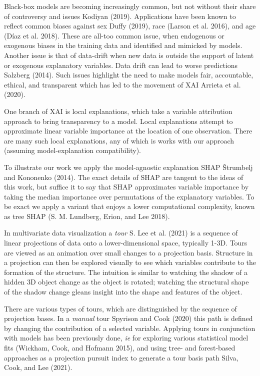 \documentclass[
]{article}
\begin{document}
Black-box models are becoming increasingly common, but not without their share of controversy and issues Kodiyan (2019). Applications have been known to reflect common biases against sex Duffy (2019), race (Larson et al. 2016), and age (Díaz et al. 2018). These are all-too common issue, when endogenous or exogenous biases in the training data and identified and mimicked by models. Another issue is that of data-drift when new data is outside the support of latent or exogenous explanatory variables. Data drift can lead to worse predictions Salzberg (2014). Such issues highlight the need to make models fair, accountable, ethical, and transparent which has led to the movement of XAI Arrieta et al. (2020).

One branch of XAI is local explanations, which take a variable attribution approach to bring transparency to a model. Local explanations attempt to approximate linear variable importance at the location of one observation. There are many such local explanations, any of which is works with our approach (assuming model-explanation compatibility).

To illustrate our work we apply the model-agnostic explanation SHAP Štrumbelj and Kononenko (2014). The exact details of SHAP are tangent to the ideas of this work, but suffice it to say that SHAP approximates variable importance by taking the median importance over permutations of the explanatory variables. To be exact we apply a variant that enjoys a lower computational complexity, known as tree SHAP (S. M. Lundberg, Erion, and Lee 2018).

In multivariate data visualization a \emph{tour} S. Lee et al. (2021) is a sequence of linear projections of data onto a lower-dimensional space, typically 1-3D. Tours are viewed as an animation over small changes to a projection basis. Structure in a projection can then be explored visually to see which variables contribute to the formation of the structure. The intuition is similar to watching the shadow of a hidden 3D object change as the object is rotated; watching the structural shape of the shadow change gleans insight into the shape and features of the object.

There are various types of tours, which are distinguished by the sequence of projection bases. In a \emph{manual} tour Spyrison and Cook (2020) this path is defined by changing the contribution of a selected variable. Applying tours in conjunction with models has been previously done, \emph{ie} for exploring various statistical model fits (Wickham, Cook, and Hofmann 2015), and using tree- and forest-based approaches as a projection pursuit index to generate a tour basis path Silva, Cook, and Lee (2021).
\end{document}

